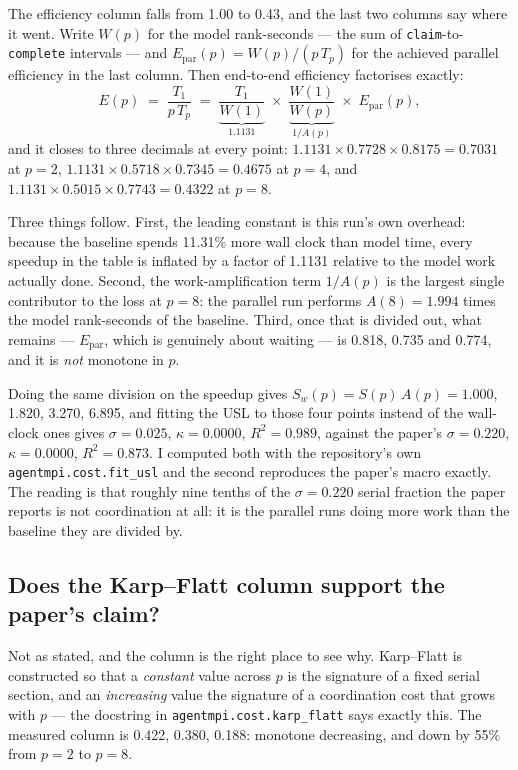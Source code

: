 \documentclass[11pt]{article}
\begin{document}
The efficiency column falls from 1.00 to 0.43, and the last two columns say where it went. Write
$W(p)$ for the model rank-seconds --- the sum of \texttt{claim}-to-\texttt{complete} intervals ---
and $E_{\mathrm{par}}(p) = W(p)/(p\,T_p)$ for the achieved parallel efficiency in the last column.
Then end-to-end efficiency factorises exactly:
\[
  E(p) \;=\; \frac{T_1}{p\,T_p} \;=\; \underbrace{\frac{T_1}{W(1)}}_{1.1131}
  \;\times\; \underbrace{\frac{W(1)}{W(p)}}_{1/A(p)} \;\times\; E_{\mathrm{par}}(p),
\]
and it closes to three decimals at every point: $1.1131\times0.7728\times0.8175=0.7031$ at $p=2$,
$1.1131\times0.5718\times0.7345=0.4675$ at $p=4$, and $1.1131\times0.5015\times0.7743=0.4322$ at
$p=8$.

Three things follow. First, the leading constant is this run's own overhead: because the baseline
spends 11.31\% more wall clock than model time, every speedup in the table is inflated by a factor
of 1.1131 relative to the model work actually done. Second, the work-amplification term $1/A(p)$
is the largest single contributor to the loss at $p=8$: the parallel run performs $A(8)=1.994$
times the model rank-seconds of the baseline. Third, once that is divided out, what remains ---
$E_{\mathrm{par}}$, which is genuinely about waiting --- is 0.818, 0.735 and 0.774, and it is
\emph{not} monotone in $p$.

Doing the same division on the speedup gives $S_w(p) = S(p)\,A(p) = 1.000$, 1.820, 3.270, 6.895,
and fitting the USL to those four points instead of the wall-clock ones gives $\sigma=0.025$,
$\kappa=0.0000$, $R^2=0.989$, against the paper's $\sigma=0.220$, $\kappa=0.0000$, $R^2=0.873$.
I computed both with the repository's own \texttt{agentmpi.cost.fit\_usl} and the second reproduces
the paper's macro exactly. The reading is that roughly nine tenths of the $\sigma=0.220$ serial
fraction the paper reports is not coordination at all: it is the parallel runs doing more work
than the baseline they are divided by.

\subsection*{Does the Karp--Flatt column support the paper's claim?}

Not as stated, and the column is the right place to see why. Karp--Flatt is constructed so that a
\emph{constant} value across $p$ is the signature of a fixed serial section, and an
\emph{increasing} value the signature of a coordination cost that grows with $p$ --- the
docstring in \texttt{agentmpi.cost.karp\_flatt} says exactly this. The measured column is 0.422,
0.380, 0.188: monotone decreasing, and down by 55\% from $p=2$ to $p=8$.
\end{document}
